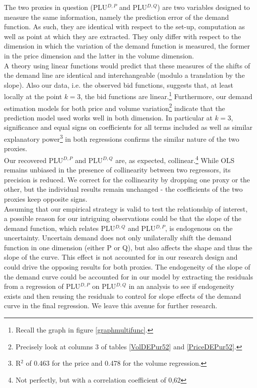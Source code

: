 The two proxies in question (PLU$^{D,P}$ and PLU$^{D,Q}$) are two variables designed to measure the same information, namely the prediction error of the demand function. As such, they are identical with respect to the set-up, computation as well as point at which they are extracted. They only differ with respect to the dimension in which the variation of the demand function is measured, the former in the price dimension and the latter in the volume dimension. \\

A theory using linear functions would predict that these measures of the shifts of the demand line are identical and interchangeable (modulo a translation by the slope). Also our data, i.e. the observed bid functions,  suggests that, at least locally at the point $k=3$, the bid functions are linear.\footnote{Recall the graph in figure \ref{graphmultifunc}.} Furthermore, our demand estimation models for both price and volume variation\footnote{Precisely look at columns 3 of tables \ref{VolDEPur52} and \ref{PriceDEPur52}.} indicate that the prediction model used works well in both dimension. In particular at $k=3$, significance and equal signs on coefficients for all terms included as well as similar explanatory power\footnote{R$^2$ of 0.463 for the price and 0.478 for the volume regression.} in both regressions confirms the similar nature of the two proxies. \\

Our recovered PLU$^{D,P}$ and PLU$^{D,Q}$ are, as expected, collinear.\footnote{Not perfectly, but with a correlation coefficient of 0,62} While OLS remains unbiased in the presence of collinearity between two regressors, its precision is reduced. We correct for the collinearity by dropping one proxy or the other, but the individual results remain unchanged - the coefficients of the two proxies keep opposite signs. \\

Assuming that our empirical strategy is valid to test the relationship of interest, a possible reason for our intriguing observations could be that the slope of the demand function, which relates PLU$^{D,Q}$ and PLU$^{D,P}$, is endogenous on the uncertainty. Uncertain demand does not only unilaterally shift the demand function in one dimension (either P or Q), but also affects the shape and thus the slope of the curve. This effect is not accounted for in our research design and could drive the opposing results for both proxies. The endogeneity of the slope of the demand curve could be accounted for in our model by extracting the residuals from a regression of PLU$^{D,P}$ on PLU$^{D,Q}$ in an analysis to see if endogeneity exists and then reusing the residuals to control for slope effects of the demand curve in the final regression. We leave this avenue for further research. \\

